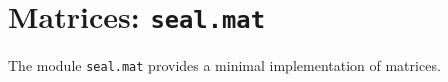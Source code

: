 
\section{Matrices: {\tt seal.mat}}

The module {\tt seal.mat} provides a minimal implementation of
matrices.
